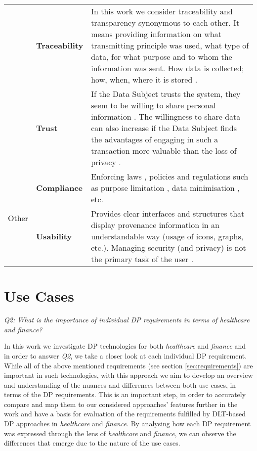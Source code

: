 \begin{table}[H]
\begin{tabular}{|m{4em}|m{6.3em}|m{11cm}|}
                          & \textbf{Traceability} & In this work we consider traceability and transparency synonymous to each other. It means providing information on what transmitting principle was used, what type of data, for what purpose and to whom the information was sent. How data is collected; how, when, where it is stored \cite[p.~13]{req_traceability13_scalability16_usability17,req_ownership_access_transparency}. \\ [0.3em]\cline{2-3}
                          & \textbf{Trust}                     & If the Data Subject trusts the system, they seem to be willing to share personal information \cite{trust_1}. The willingness to share data can also increase if the Data Subject finds the advantages of engaging in such a transaction more valuable than the loss of privacy \cite{trust_2,trust_3}. \\ [12pt]\hline\hline
\multirow{6}{*}{\centerline{Other}}    & \textbf{Compliance}                   & Enforcing laws \cite{gdpr_chap3}, policies and regulations such as purpose limitation \cite{req_policies_pl}, data minimisation \cite{req_policies_dm}, etc. \\ [12pt]\cline{2-3}
                          & \textbf{Usability}                  & Provides clear interfaces and structures that display provenance information in an understandable way (usage of icons, graphs, etc.). Managing security (and privacy) is not the primary task of the user \cite{req_traceability13_scalability16_usability17}. \\ \hline
\end{tabular}

\end{table}

\newpage

\section{Use Cases}
\label{sec:usecases}

\textit{Q2: What is the importance of individual DP requirements in terms of healthcare and finance?}\newline

In this work we investigate DP technologies for both \textit{healthcare} and \textit{finance} and in order to answer \textit{Q2}, we take a closer look at each individual DP requirement. While all of the above mentioned requirements (see section \ref{sec:requirements}) are important in such technologies, with this approach we aim to develop an overview and understanding of the nuances and differences between both use cases, in terms of the DP requirements. This is an important step, in order to accurately compare and map them to our considered approaches' features further in the work and have a basis for evaluation of the requirements fulfilled by DLT-based DP approaches in \textit{healthcare} and \textit{finance}. By analysing how each DP requirement was expressed through the lens of \textit{healthcare} and \textit{finance}, we can observe the differences that emerge due to the nature of the use cases. 

